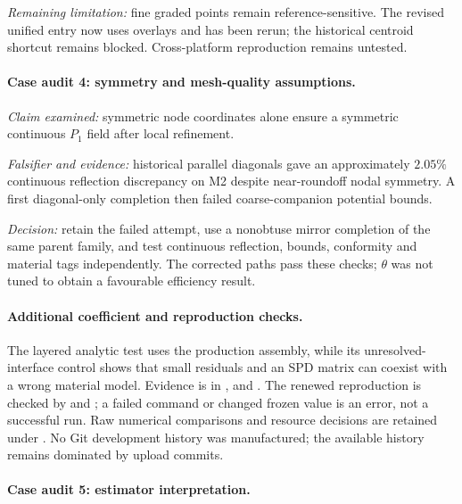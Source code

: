 \documentclass[11pt]{article}
\begin{document}
\noindent\textit{Remaining limitation:} fine graded points remain reference-sensitive. The revised unified entry now uses overlays and has been rerun; the historical centroid shortcut remains blocked. Cross-platform reproduction remains untested.

\paragraph{Case audit 4: symmetry and mesh-quality assumptions.}

\noindent\textit{Claim examined:} symmetric node coordinates alone ensure a symmetric continuous $P_1$ field after local refinement.

\noindent\textit{Falsifier and evidence:} historical parallel diagonals gave an approximately $2.05\%$ continuous reflection discrepancy on M2 despite near-roundoff nodal symmetry. A first diagonal-only completion then failed coarse-companion potential bounds.

\noindent\textit{Decision:} retain the failed attempt, use a nonobtuse mirror completion of the same parent family, and test continuous reflection, bounds, conformity and material tags independently. The corrected paths pass these checks; $\theta$ was not tuned to obtain a favourable efficiency result.

\paragraph{Additional coefficient and reproduction checks.}
The layered analytic test uses the production assembly, while its unresolved-interface control shows that small residuals and an SPD matrix can coexist with a wrong material model. Evidence is in ,  and . The renewed reproduction is checked by  and ; a failed command or changed frozen value is an error, not a successful run. Raw numerical comparisons and resource decisions are retained under . No Git development history was manufactured; the available history remains dominated by upload commits.

\paragraph{Case audit 5: estimator interpretation.}
\end{document}
